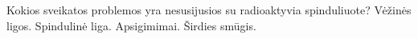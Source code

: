 Kokios sveikatos problemos yra nesusijusios su radioaktyvia spinduliuote?
Vėžinės ligos.
Spindulinė liga.
Apsigimimai.
Širdies smūgis.